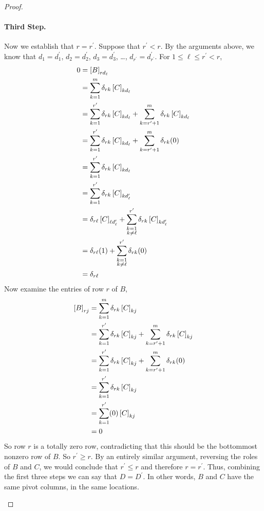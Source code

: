 \documentclass{ximera}
\begin{document}
\begin{theorem}
\begin{proof}
\begin{expandable}
\paragraph*{Third Step.}  Now we establish that $r=r^\prime$.  Suppose that $r^\prime<r$.  By the arguments above, we know that $d_1=d^\prime_1$, $d_2=d^\prime_2$, $d_3=d^\prime_3$, \ldots, $d_{r^\prime}=d^\prime_{r^\prime}$.   For $1\leq\ell\leq r^\prime<r$,
\begin{align*}
0
&=\left\lbrack B\right\rbrack_{rd_\ell}
\\
&=\sum_{k=1}^{m}\delta_{rk}\left\lbrack C\right\rbrack_{kd_\ell}\\
&=
\sum_{k=1}^{r^\prime}\delta_{rk}\left\lbrack C\right\rbrack_{kd_\ell}
+
\sum_{k=r^\prime+1}^{m}\delta_{rk}\left\lbrack C\right\rbrack_{kd_\ell}
\\
&=
\sum_{k=1}^{r^\prime}\delta_{rk}\left\lbrack C\right\rbrack_{kd_\ell}
+
\sum_{k=r^\prime+1}^{m}\delta_{rk}(0)
\\
&=\sum_{k=1}^{r^\prime}\delta_{rk}\left\lbrack C\right\rbrack_{kd_\ell}\\
&=\sum_{k=1}^{r^\prime}\delta_{rk}\left\lbrack C\right\rbrack_{kd^\prime_\ell}\\
&=
\delta_{r\ell}\left\lbrack C\right\rbrack_{\ell d^\prime_\ell}
+
\sum_{\substack{k=1\\k\neq\ell}}^{r^\prime}\delta_{rk}\left\lbrack C\right\rbrack_{kd^\prime_\ell}
\\
&=
\delta_{r\ell}(1)
+
\sum_{\substack{k=1\\k\neq\ell}}^{r^\prime}\delta_{rk}(0)
\\
&=\delta_{r\ell}
\end{align*}
Now examine the entries of row $r$ of $B$,
\begin{align*}
\left\lbrack B\right\rbrack_{rj}
&=\sum_{k=1}^{m}\delta_{rk}\left\lbrack C\right\rbrack_{kj}\\
&=
\sum_{k=1}^{r^\prime}\delta_{rk}\left\lbrack C\right\rbrack_{kj}
+
\sum_{k=r^\prime+1}^{m}\delta_{rk}\left\lbrack C\right\rbrack_{kj}
\\
&=
\sum_{k=1}^{r^\prime}\delta_{rk}\left\lbrack C\right\rbrack_{kj}
+
\sum_{k=r^\prime+1}^{m}\delta_{rk}(0)
\\
&=\sum_{k=1}^{r^\prime}\delta_{rk}\left\lbrack C\right\rbrack_{kj}\\
&=\sum_{k=1}^{r^\prime}(0)\left\lbrack C\right\rbrack_{kj}\\
&=0
\end{align*}
So row $r$ is a totally zero row, contradicting that this should be the bottommost nonzero row of $B$.  So $r^\prime\geq r$.  By an entirely similar argument, reversing the roles of $B$ and $C$, we would conclude that $r^\prime\leq r$ and therefore $r=r^\prime$.  Thus, combining the first three steps we can say that $D=D^\prime$.  In other words, $B$ and $C$ have the same pivot columns, in the same locations.


\end{expandable}
\end{proof}
\end{theorem}
\end{document}
